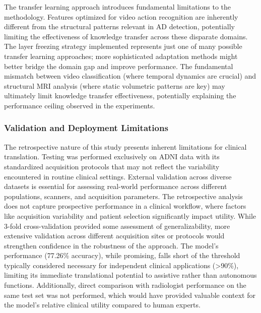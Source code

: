 \documentclass[11pt, a4paper]{article}
\begin{document}
The transfer learning approach introduces fundamental limitations to the methodology. Features optimized for video action recognition are inherently different from the structural patterns relevant in AD detection, potentially limiting the effectiveness of knowledge transfer across these disparate domains. The layer freezing strategy implemented represents just one of many possible transfer learning approaches; more sophisticated adaptation methods might better bridge the domain gap and improve performance. The fundamental mismatch between video classification (where temporal dynamics are crucial) and structural MRI analysis (where static volumetric patterns are key) may ultimately limit knowledge transfer effectiveness, potentially explaining the performance ceiling observed in the experiments.

\subsubsection{Validation and Deployment Limitations}

The retrospective nature of this study presents inherent limitations for clinical translation. Testing was performed exclusively on ADNI data with its standardized acquisition protocols that may not reflect the variability encountered in routine clinical settings. External validation across diverse datasets is essential for assessing real-world performance across different populations, scanners, and acquisition parameters. The retrospective analysis does not capture prospective performance in a clinical workflow, where factors like acquisition variability and patient selection significantly impact utility. While 3-fold cross-validation provided some assessment of generalizability, more extensive validation across different acquisition sites or protocols would strengthen confidence in the robustness of the approach. The model's performance (77.26\% accuracy), while promising, falls short of the threshold typically considered necessary for independent clinical applications (>90\%), limiting its immediate translational potential to assistive rather than autonomous functions. Additionally, direct comparison with radiologist performance on the same test set was not performed, which would have provided valuable context for the model's relative clinical utility compared to human experts.

\end{document}
